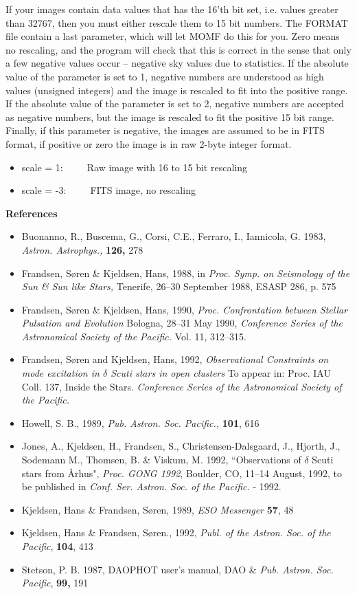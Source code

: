\documentclass[]{article}
\begin{document}
If your images contain data values that has the 16'th bit set, i.e.
values greater than 32767, then you must either rescale them to 15
bit numbers. The FORMAT file contain a last parameter, which will
let MOMF do this for you. Zero means no rescaling, and the program
will check that this is correct in the sense that only a few
negative values occur -- negative sky values due to statistics.
If the absolute value of the parameter is set to 1, negative numbers are understood as
high values (unsigned integers) and the image is rescaled to fit into the
positive range. If the absolute value of the parameter is set to 2, negative numbers
are accepted as negative numbers, but the image is rescaled
to fit the positive 15 bit range.
Finally, if this parameter is negative, the images are assumed to be in
FITS format, if positive or zero the image is in raw 2-byte integer format.
\begin{itemize}
\item
scale = 1:~~~~~Raw image with 16 to 15 bit rescaling
\item
scale = -3:~~~~~FITS image, no rescaling
\end{itemize}
\vspace{10mm}
\Large

{\bf References}
\normalsize
\begin{itemize}
\item
Buonanno, R., Buscema, G., Corsi, C.E., Ferraro,
I., Iannicola, G.  1983,
{\em Astron. Astrophys.,} {\bf 126,} 278
\item
Frandsen, S{\o}ren \& Kjeldsen, Hans, 1988, in
{\em Proc. Symp. on Seismology of the Sun \&}
{\em Sun like Stars,}
Tenerife, 26--30 September 1988, ESASP 286, p. 575
\item
Frandsen, S{\o}ren \& Kjeldsen, Hans, 1990,
{\em Proc. Confrontation between Stellar}
{\em Pulsation and Evolution}
Bologna, 28--31 May 1990,
{\em Conference Series of the Astronomical Society of the Pacific.}
Vol. 11, 312--315.
\item
Frandsen, S{\o}ren and Kjeldsen, Hans, 1992, {\em Observational Constraints 
on
mode excitation in $\delta$ Scuti stars in open clusters}
To appear in: Proc. IAU Coll. 137, Inside the Stars.
{\em Conference Series of the Astronomical Society of the Pacific.}
\item
Howell, S. B., 1989, {\em Pub. Astron. Soc. Pacific.,} {\bf 101}, 616
\item
Jones, A., Kjeldsen, H., Frandsen, S.,
Christensen-Dalsgaard, J., Hjorth, J., Sodemann
M., Thomsen, B. \& Viskum, M. 1992, ``Observations of
$\delta$ Scuti stars from {\AA}rhus",
{\em Proc. GONG 1992},
Boulder, CO, 11--14 August, 1992, to be published in
{\em Conf. Ser. Astron. Soc. of the Pacific.} - 1992.
\item
Kjeldsen, Hans \& Frandsen, S{\o}ren, 1989,
{\em ESO Messenger} {\bf 57}, 48
\item
Kjeldsen, Hans \& Frandsen, S{\o}ren., 1992,
{\em Publ. of the Astron. Soc. of the Pacific},
{\bf 104}, 413
\item
Stetson, P. B. 1987, DAOPHOT user's manual, DAO \& {\em
Pub. Astron. Soc.}
{\em Pacific}, {\bf 99,} 191
\end{itemize}
\newpage
\end{document}
